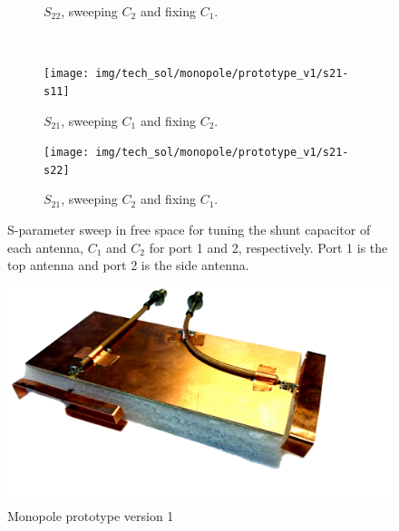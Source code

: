 \begin{figure}[htbp]
\begin{subfigure}[b]{0.49\linewidth}
        \caption{$S_{22}$, sweeping $C_2$ and fixing $C_1$.}
        \label{fig:ant1_s22}
    \end{subfigure}
~
    \begin{subfigure}[b]{0.49\linewidth}
        \centering
        \texttt{[image: img/tech\_sol/monopole/prototype\_v1/s21-s11]}
        \caption{$S_{21}$, sweeping $C_1$ and fixing $C_2$.}
        \label{fig:ant1_s11}
    \end{subfigure}
    \hfill
    \begin{subfigure}[b]{0.49\linewidth}
        \centering
        \texttt{[image: img/tech\_sol/monopole/prototype\_v1/s21-s22]}
        \caption{$S_{21}$, sweeping $C_2$ and fixing $C_1$.}
        \label{fig:ant1_s22}
    \end{subfigure}
    \caption{S-parameter sweep in free space for tuning the shunt capacitor of each antenna, $C_1$ and $C_2$ for port 1 and 2, respectively. Port 1 is the top antenna and port 2 is the side antenna.}
    \label{fig:sparam_mono_free_space}
\end{figure}

\begin{figure}
    \centering
    \includegraphics[scale=0.1]{img/tech_sol/monopole/prototype/monopole_v1}
    \caption{Monopole prototype version 1}
    \label{fig:ant1_proto1_3d}
\end{figure}

